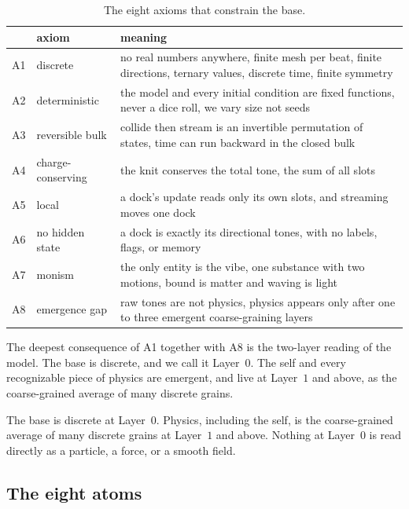 \begin{table}[ht]
\centering
\begin{tabular}{@{}lll@{}}
\toprule
 & axiom & meaning \\
\midrule
A1 & discrete & no real numbers anywhere, finite mesh per beat, finite directions, ternary values, discrete time, finite symmetry \\
A2 & deterministic & the model and every initial condition are fixed functions, never a dice roll, we vary size not seeds \\
A3 & reversible bulk & collide then stream is an invertible permutation of states, time can run backward in the closed bulk \\
A4 & charge-conserving & the knit conserves the total tone, the sum of all slots \\
A5 & local & a dock's update reads only its own slots, and streaming moves one dock \\
A6 & no hidden state & a dock is exactly its directional tones, with no labels, flags, or memory \\
A7 & monism & the only entity is the vibe, one substance with two motions, bound is matter and waving is light \\
A8 & emergence gap & raw tones are not physics, physics appears only after one to three emergent coarse-graining layers \\
\bottomrule
\end{tabular}
\caption{The eight axioms that constrain the base.}
\label{tab:axioms}
\end{table}

The deepest consequence of A1 together with A8 is the two-layer reading of the model. The base is discrete, and we call it Layer~$0$. The self and every recognizable piece of physics are emergent, and live at Layer~$1$ and above, as the coarse-grained average of many discrete grains.

\begin{principle}
The base is discrete at Layer~$0$. Physics, including the self, is the coarse-grained average of many discrete grains at Layer~$1$ and above. Nothing at Layer~$0$ is read directly as a particle, a force, or a smooth field.
\end{principle}

\subsection{The eight atoms}

